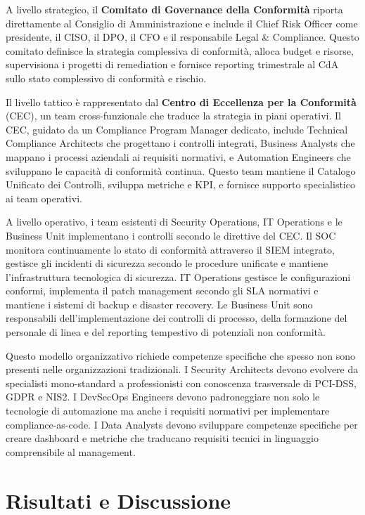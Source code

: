 A livello strategico, il \textbf{Comitato di Governance della Conformità} riporta direttamente al Consiglio di Amministrazione e include il Chief Risk Officer come presidente, il CISO, il DPO, il CFO e il responsabile Legal \& Compliance. Questo comitato definisce la strategia complessiva di conformità, alloca budget e risorse, supervisiona i progetti di remediation e fornisce reporting trimestrale al CdA sullo stato complessivo di conformità e rischio.

Il livello tattico è rappresentato dal \textbf{Centro di Eccellenza per la Conformità} (CEC), un team cross-funzionale che traduce la strategia in piani operativi. Il CEC, guidato da un Compliance Program Manager dedicato, include Technical Compliance Architects che progettano i controlli integrati, Business Analysts che mappano i processi aziendali ai requisiti normativi, e Automation Engineers che sviluppano le capacità di conformità continua. Questo team mantiene il Catalogo Unificato dei Controlli, sviluppa metriche e KPI, e fornisce supporto specialistico ai team operativi.

A livello operativo, i team esistenti di Security Operations, IT Operations e le Business Unit implementano i controlli secondo le direttive del CEC. Il SOC monitora continuamente lo stato di conformità attraverso il SIEM integrato, gestisce gli incidenti di sicurezza secondo le procedure unificate e mantiene l'infrastruttura tecnologica di sicurezza. IT Operations gestisce le configurazioni conformi, implementa il patch management secondo gli SLA normativi e mantiene i sistemi di backup e disaster recovery. Le Business Unit sono responsabili dell'implementazione dei controlli di processo, della formazione del personale di linea e del reporting tempestivo di potenziali non conformità.

Questo modello organizzativo richiede competenze specifiche che spesso non sono presenti nelle organizzazioni tradizionali. I Security Architects devono evolvere da specialisti mono-standard a professionisti con conoscenza trasversale di PCI-DSS, GDPR e NIS2. I DevSecOps Engineers devono padroneggiare non solo le tecnologie di automazione ma anche i requisiti normativi per implementare compliance-as-code. I Data Analysts devono sviluppare competenze specifiche per creare dashboard e metriche che traducano requisiti tecnici in linguaggio comprensibile al management.

\section{\texorpdfstring{Risultati e Discussione}{4.6 - Risultati e Discussione}}
\label{sec:4.6_risultati}

